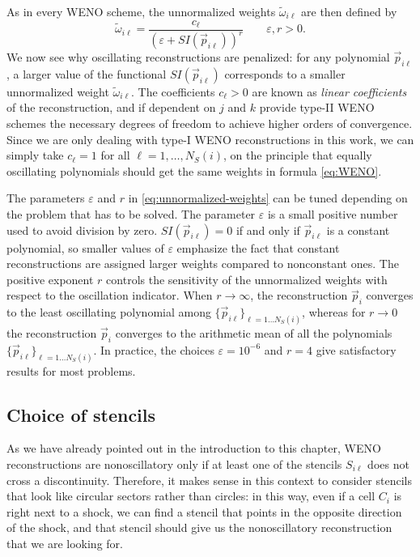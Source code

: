 As in every WENO scheme, the unnormalized weights $\tilde{\omega}_{i\ell}$
are then defined by
\begin{equation} \label{eq:unnormalized-weights}
\tilde{\omega}_{i\ell} = \frac{c_\ell}{(\varepsilon + S\!I(\vec{p}_{i\ell}))^r}
\qquad \varepsilon,r > 0.
\end{equation}
We now see why oscillating reconstructions are penalized: for any
polynomial $\vec{p}_{i\ell}$, a larger value of the functional
$S\!I(\vec{p}_{i\ell})$ corresponds to a smaller unnormalized weight
$\tilde{\omega}_{i\ell}$.
The coefficients $c_\ell > 0$ are known as \emph{linear coefficients} of the
reconstruction, and if dependent on $j$ and $k$ provide type-II WENO
schemes the necessary degrees of freedom to achieve higher orders of convergence.
Since we are only dealing with type-I WENO reconstructions in this work,
we can simply take $c_\ell = 1$ for all $\ell = 1, \dots, N_S(i)$,
on the principle that equally oscillating polynomials should
get the same weights in formula \eqref{eq:WENO}.

The parameters $\varepsilon$ and $r$ in \eqref{eq:unnormalized-weights}
can be tuned depending on the problem that has to be solved.
The parameter $\varepsilon$ is a small positive number used to avoid division by zero.
$S\!I(\vec{p}_{i\ell}) = 0$ if and only if $\vec{p}_{i\ell}$ is a constant
polynomial, so smaller values of $\varepsilon$ emphasize the fact
that constant reconstructions are assigned larger weights compared
to nonconstant ones.
The positive exponent $r$ controls the sensitivity of the unnormalized weights
with respect to the oscillation indicator. When $r \to \infty$, the reconstruction
$\vec{p}_i$ converges to the least oscillating polynomial among
$\{\vec{p}_{i\ell}\}_{\ell = 1 \dots N_S(i)}$,
whereas for $r \to 0$ the reconstruction $\vec{p}_i$ converges to the
arithmetic mean of all the polynomials $\{\vec{p}_{i\ell}\}_{\ell = 1 \dots N_S(i)}$.
In practice, the choices $\varepsilon = 10^{-6}$ and $r = 4$ give satisfactory
results for most problems.

\subsection*{Choice of stencils}
As we have already pointed out in the introduction to this chapter,
WENO reconstructions are nonoscillatory only if at least one of the
stencils $S_{i\ell}$ does not cross a discontinuity.
Therefore, it makes sense in this context to consider stencils
that look like circular sectors rather than circles: in this way,
even if a cell $C_i$ is right next to a shock, we can find a stencil
that points in the opposite direction of the shock, and that stencil
should give us the nonoscillatory reconstruction that we are looking for.

